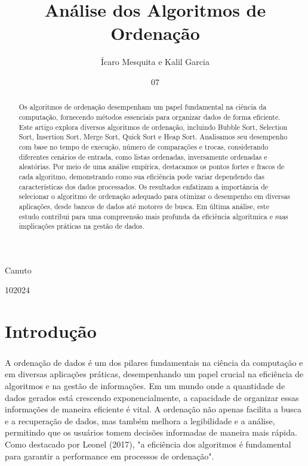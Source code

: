 \documentclass[tcc1,project]{uftex}
\begin{document}
\setlength\parindent{15pt}


  \title{Análise dos Algoritmos de Ordenação}
  \author{Ícaro Mesquita e Kalil Garcia}{Canuto}


  \date{07}{10}{2024}

  

  \maketitle

  \begin{abstract}
\paragraph{}
Os algoritmos de ordenação desempenham um papel fundamental na ciência da computação, fornecendo métodos essenciais para organizar dados de forma eficiente. Este artigo explora diversos algoritmos de ordenação, incluindo Bubble Sort, Selection Sort, Insertion Sort, Merge Sort, Quick Sort e Heap Sort. Analisamos seu desempenho com base no tempo de execução, número de comparações e trocas, considerando diferentes cenários de entrada, como listas ordenadas, inversamente ordenadas e aleatórias. Por meio de uma análise empírica, destacamos os pontos fortes e fracos de cada algoritmo, demonstrando como sua eficiência pode variar dependendo das características dos dados processados. Os resultados enfatizam a importância de selecionar o algoritmo de ordenação adequado para otimizar o desempenho em diversas aplicações, desde bancos de dados até motores de busca. Em última análise, este estudo contribui para uma compreensão mais profunda da eficiência algorítmica e suas implicações práticas na gestão de dados.
 \end{abstract}


\chapter{Introdução}
\paragraph{}
A ordenação de dados é um dos pilares fundamentais na ciência da computação e em diversas aplicações práticas, desempenhando um papel crucial na eficiência de algoritmos e na gestão de informações. Em um mundo onde a quantidade de dados gerados está crescendo exponencialmente, a capacidade de organizar essas informações de maneira eficiente é vital. A ordenação não apenas facilita a busca e a recuperação de dados, mas também melhora a legibilidade e a análise, permitindo que os usuários tomem decisões informadas de maneira mais rápida. Como destacado por Leonel (2017), "a eficiência dos algoritmos é fundamental para garantir a performance em processos de ordenação".
\end{document}
